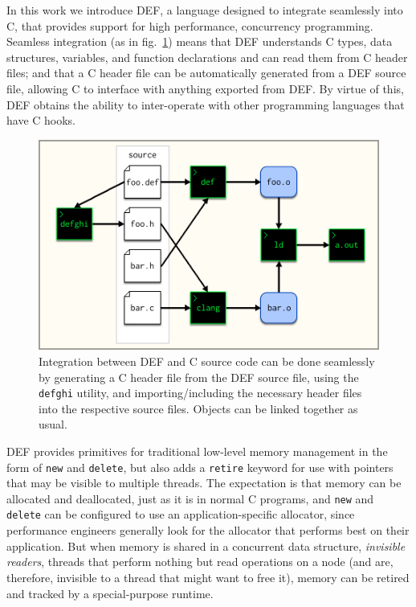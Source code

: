 In this work we introduce DEF, a language designed to integrate seamlessly into C, that provides support for high performance, concurrency programming.  Seamless integration (as in fig.~\ref{fig:seemless-integration}) means that DEF understands C types, data structures, variables, and function declarations and can read them from C header files; and that a C header file can be automatically generated from a DEF source file, allowing C to interface with anything exported from DEF.  By virtue of this, DEF obtains the ability to inter-operate with other programming languages that have C hooks.

\begin{figure}[htbp!]
        \centering
        \includegraphics[scale=0.25]{gfx/seemless-integration}
        \caption{Integration between DEF and C source code can be done seamlessly by generating a C header file from the DEF source file, using the \texttt{defghi} utility, and importing/including the necessary header files into the respective source files.  Objects can be linked together as usual.}
        \label{fig:seemless-integration}
\end{figure}

DEF provides primitives for traditional low-level memory management in the form of \texttt{new} and \texttt{delete}, but also adds a \texttt{retire} keyword for use with pointers that may be visible to multiple threads.  The expectation is that memory can be allocated and deallocated, just as it is in normal C programs, and \texttt{new} and \texttt{delete} can be configured to use an application-specific allocator, since performance engineers generally look for the allocator that performs best on their application.  But when memory is shared in a concurrent data structure, \textit{invisible readers}, threads that perform nothing but read operations on a node (and are, therefore, invisible to a thread that might want to free it), memory can be retired and tracked by a special-purpose runtime.

